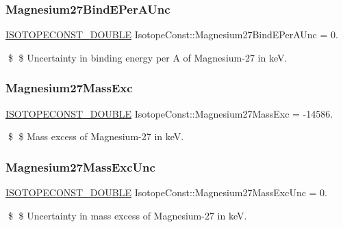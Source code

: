 \subsubsection{\texorpdfstring{Magnesium27\+Bind\+E\+Per\+A\+Unc}{Magnesium27BindEPerAUnc}}
{\footnotesize\ttfamily \mbox{\hyperlink{group___isotope_const-_macros_ga8f45a7272ce02c0b4c65c44636ed719a}{I\+S\+O\+T\+O\+P\+E\+C\+O\+N\+S\+T\+\_\+\+D\+O\+U\+B\+LE}} Isotope\+Const\+::\+Magnesium27\+Bind\+E\+Per\+A\+Unc = 0.}

\$ \$ Uncertainty in binding energy per A of Magnesium-\/27 in keV. \mbox{\label{group___isotope_const-_magnesium-_mg27_ga86285f1595a5643b835fc9581149e908}} 
\subsubsection{\texorpdfstring{Magnesium27\+Mass\+Exc}{Magnesium27MassExc}}
{\footnotesize\ttfamily \mbox{\hyperlink{group___isotope_const-_macros_ga8f45a7272ce02c0b4c65c44636ed719a}{I\+S\+O\+T\+O\+P\+E\+C\+O\+N\+S\+T\+\_\+\+D\+O\+U\+B\+LE}} Isotope\+Const\+::\+Magnesium27\+Mass\+Exc = -\/14586.}

\$ \$ Mass excess of Magnesium-\/27 in keV. \mbox{\label{group___isotope_const-_magnesium-_mg27_gad1a1f86bff05af9fc73047e0928bab80}} 
\subsubsection{\texorpdfstring{Magnesium27\+Mass\+Exc\+Unc}{Magnesium27MassExcUnc}}
{\footnotesize\ttfamily \mbox{\hyperlink{group___isotope_const-_macros_ga8f45a7272ce02c0b4c65c44636ed719a}{I\+S\+O\+T\+O\+P\+E\+C\+O\+N\+S\+T\+\_\+\+D\+O\+U\+B\+LE}} Isotope\+Const\+::\+Magnesium27\+Mass\+Exc\+Unc = 0.}

\$ \$ Uncertainty in mass excess of Magnesium-\/27 in keV. \mbox{\label{group___isotope_const-_magnesium-_mg27_gac1c07194199c3753ba5686f1eed5d07c}} 
